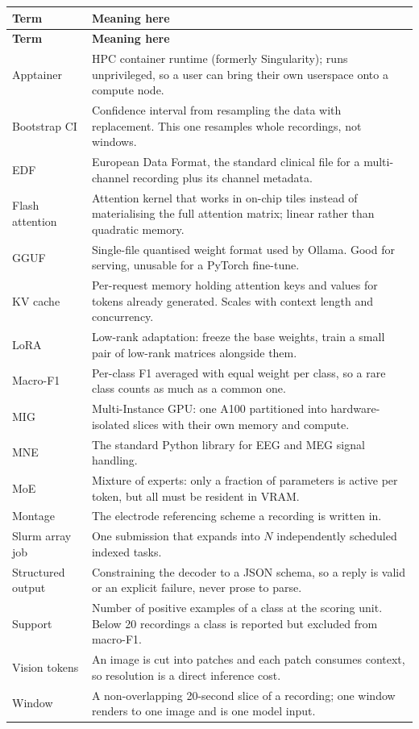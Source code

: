 \documentclass[11pt,a4paper]{article}
\begin{document}
{\small
\begin{longtable}{@{}p{3.4cm}p{13.1cm}@{}}
\toprule
\textbf{\sffamily Term} & \textbf{\sffamily Meaning here} \\
\midrule
\endfirsthead
\toprule
\textbf{\sffamily Term} & \textbf{\sffamily Meaning here} \\
\midrule
\endhead
Apptainer & HPC container runtime (formerly Singularity); runs unprivileged, so a user can bring their own userspace onto a compute node. \\
Bootstrap CI & Confidence interval from resampling the data with replacement. This one resamples whole recordings, not windows. \\
EDF & European Data Format, the standard clinical file for a multi-channel recording plus its channel metadata. \\
Flash attention & Attention kernel that works in on-chip tiles instead of materialising the full attention matrix; linear rather than quadratic memory. \\
GGUF & Single-file quantised weight format used by Ollama. Good for serving, unusable for a PyTorch fine-tune. \\
KV cache & Per-request memory holding attention keys and values for tokens already generated. Scales with context length and concurrency. \\
LoRA & Low-rank adaptation: freeze the base weights, train a small pair of low-rank matrices alongside them. \\
Macro-F1 & Per-class F1 averaged with equal weight per class, so a rare class counts as much as a common one. \\
MIG & Multi-Instance GPU: one A100 partitioned into hardware-isolated slices with their own memory and compute. \\
MNE & The standard Python library for EEG and MEG signal handling. \\
MoE & Mixture of experts: only a fraction of parameters is active per token, but all must be resident in VRAM. \\
Montage & The electrode referencing scheme a recording is written in. \\
Slurm array job & One submission that expands into $N$ independently scheduled indexed tasks. \\
Structured output & Constraining the decoder to a JSON schema, so a reply is valid or an explicit failure, never prose to parse. \\
Support & Number of positive examples of a class at the scoring unit. Below 20 recordings a class is reported but excluded from macro-F1. \\
Vision tokens & An image is cut into patches and each patch consumes context, so resolution is a direct inference cost. \\
Window & A non-overlapping 20-second slice of a recording; one window renders to one image and is one model input. \\
\bottomrule
\end{longtable}}
\end{document}
